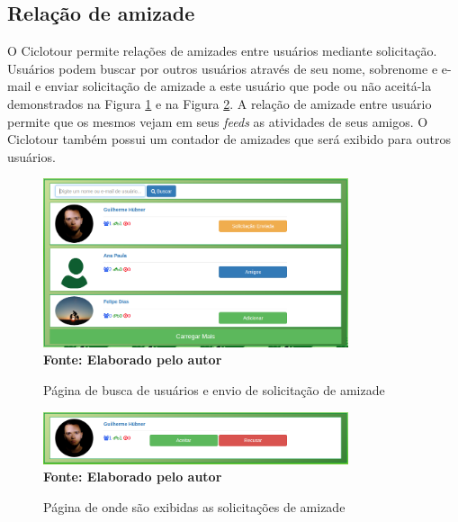 \subsection{Relação de amizade}

O Ciclotour permite relações de amizades entre usuários mediante solicitação. Usuários podem buscar por outros usuários através de seu nome, 
sobrenome e e-mail e enviar solicitação de amizade a este usuário que pode ou não aceitá-la demonstrados na Figura \ref{fig:buscarUsuario} e na 
Figura \ref{fig:solicitacaoAmizade}. A relação de amizade entre usuário permite que os mesmos vejam em seus \textit{feeds} as atividades de seus 
amigos. O Ciclotour também possui um contador de amizades que será exibido para outros usuários.

\begin{figure}[!ht]
	\centering	
	\caption[\hspace{0.1cm} Buscar usuários.]
	{Página de busca de usuários e envio de solicitação de amizade}
	  \vspace{-0.4cm}
	\includegraphics[width=0.8\textwidth]{figuras/buscarUsuario.png}
	 \vspace{0cm}
	\\\textbf{\footnotesize Fonte: Elaborado pelo autor}
	\label{fig:buscarUsuario}
\end{figure}

\begin{figure}[!ht]
	\centering	
	\caption[\hspace{0.1cm} Solicitações de amizade.]
	{Página de onde são exibidas as solicitações de amizade}
	  \vspace{-0.4cm}
	\includegraphics[width=0.8\textwidth]{figuras/solicitacaoAmizade.png}
	 \vspace{0cm}
	\\\textbf{\footnotesize Fonte: Elaborado pelo autor}
	\label{fig:solicitacaoAmizade}
\end{figure}

